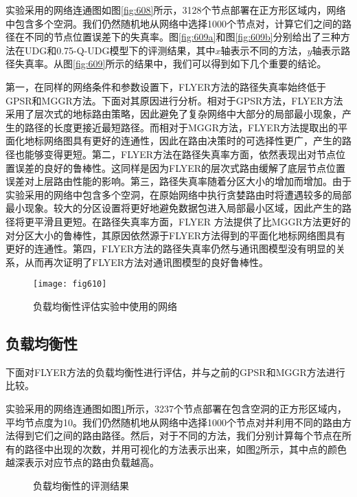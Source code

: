 实验采用的网络连通图如图\ref{fig:608}所示，3128个节点部署在正方形区域内，网络中包含多个空洞。我们仍然随机地从网络中选择1000个节点对，计算它们之间的路径在不同的节点位置误差下的失真率。图\ref{fig:609a}和图\ref{fig:609b}分别给出了三种方法在UDG和0.75-Q-UDG模型下的评测结果，其中$x$轴表示不同的方法，$y$轴表示路径失真率。从图\ref{fig:609}所示的结果中，我们可以得到如下几个重要的结论。

第一，在同样的网络条件和参数设置下，FLYER方法的路径失真率始终低于GPSR和MGGR方法。下面对其原因进行分析。相对于GPSR方法，FLYER方法采用了层次式的地标路由策略，因此避免了复杂网络中大部分的局部最小现象，产生的路径的长度更接近最短路径。而相对于MGGR方法，FLYER方法提取出的平面化地标网络图具有更好的连通性，因此在路由决策时的可选择性更广，产生的路径也能够变得更短。第二，FLYER方法在路径失真率方面，依然表现出对节点位置误差的良好的鲁棒性。这同样是因为FLYER的层次式路由缓解了底层节点位置误差对上层路由性能的影响。第三，路径失真率随着分区大小的增加而增加。由于实验采用的网络中包含多个空洞，在原始网络中执行贪婪路由时将遭遇较多的局部最小现象。较大的分区设置将更好地避免数据包进入局部最小区域，因此产生的路径将更平滑且更短。在路径失真率方面，FLYER 方法提供了比MGGR方法更好的对分区大小的鲁棒性，其原因依然源于FLYER方法得到的平面化地标网络图具有更好的连通性。第四，FLYER方法的路径失真率仍然与通讯图模型没有明显的关系，从而再次证明了FLYER方法对通讯图模型的良好鲁棒性。
\begin{figure}[t]
\centering
\texttt{[image: fig610]}
\caption{负载均衡性评估实验中使用的网络}
\label{fig:610}
\end{figure}
\subsection{负载均衡性}
下面对FLYER方法的负载均衡性进行评估，并与之前的GPSR和MGGR方法进行比较。

实验采用的网络连通图如图\ref{fig:610}所示，3237个节点部署在包含空洞的正方形区域内，平均节点度为10。我们仍然随机地从网络中选择1000个节点对并利用不同的路由方法得到它们之间的路由路径。然后，对于不同的方法，我们分别计算每个节点在所有的路径中出现的次数，并用可视化的方法表示出来，如图\ref{fig:611}所示，其中点的颜色越深表示对应节点的路由负载越高。
\begin{figure}[t]
  \centering
  \hspace{0.5em}%
  \hspace{0.5em}%
  \hspace{0.5em}%
  \caption{负载均衡性的评测结果}
  \label{fig:611}
\end{figure}

